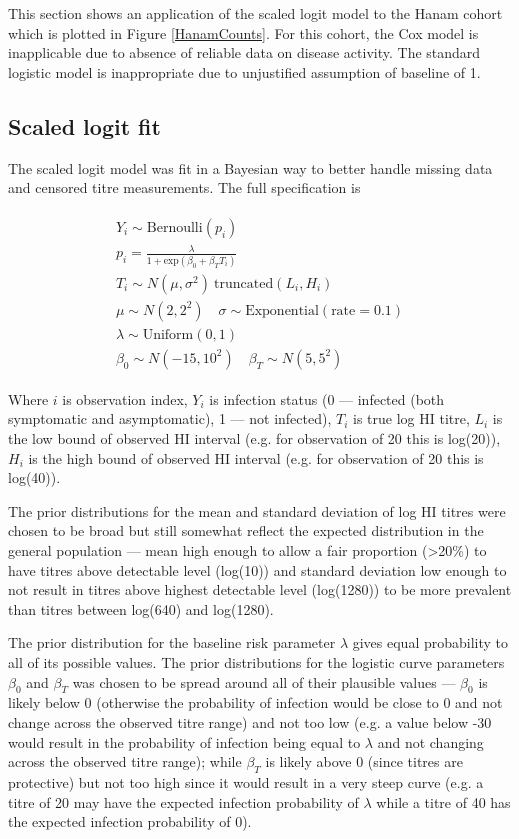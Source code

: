 \documentclass[12pt]{article}
\begin{document}
This section shows an application of the scaled logit model to the Hanam cohort which is plotted in Figure \ref{HanamCounts}. For this cohort, the Cox model is inapplicable due to absence of reliable data on disease activity. The standard logistic model is inappropriate due to unjustified assumption of baseline of 1.

\subsection{Scaled logit fit}

The scaled logit model was fit in a Bayesian way to better handle missing data and censored titre measurements. The full specification is

\begin{align*}
\begin{gathered}
Y_i \sim \text{Bernoulli}(p_i) \\
p_i = \frac{\lambda}{1 + \text{exp}(\beta_0 + \beta_T T_i)} \\
T_i \sim N(\mu, \sigma^2) \ \text{truncated}(L_{i}, H_{i}) \\
\mu \sim N(2, 2^2) \quad \sigma \sim \text{Exponential}(\text{rate} = 0.1) \\
\lambda \sim \text{Uniform}(0, 1) \\
\beta_0 \sim N(-15, 10^2) \quad \beta_T \sim N(5, 5^2)
\end{gathered}
\end{align*}

Where $i$ is observation index, $Y_i$ is infection status (0 --- infected (both symptomatic and asymptomatic), 1 --- not infected), $T_i$ is true log HI titre, $L_i$ is the low bound of observed HI interval (e.g. for observation of 20 this is log(20)), $H_i$ is the high bound of observed HI interval (e.g. for observation of 20 this is log(40)).

The prior distributions for the mean and standard deviation of log HI titres were chosen to be broad but still somewhat reflect the expected distribution in the general population --- mean high enough to allow a fair proportion (>20\%) to have titres above detectable level (log(10)) and standard deviation low enough to not result in titres above highest detectable level (log(1280)) to be more prevalent than titres between log(640) and log(1280).

The prior distribution for the baseline risk parameter $\lambda$ gives equal probability to all of its possible values. The prior distributions for the logistic curve parameters $\beta_0$ and $\beta_T$ was chosen to be spread around all of their plausible values --- $\beta_0$ is likely below 0 (otherwise the probability of infection would be close to 0 and not change across the observed titre range) and not too low (e.g. a value below -30 would result in the probability of infection being equal to $\lambda$ and not changing across the observed titre range); while $\beta_T$ is likely above 0 (since titres are protective) but not too high since it would result in a very steep curve (e.g. a titre of 20 may have the expected infection probability of $\lambda$ while a titre of 40 has the expected infection probability of 0).
\end{document}
